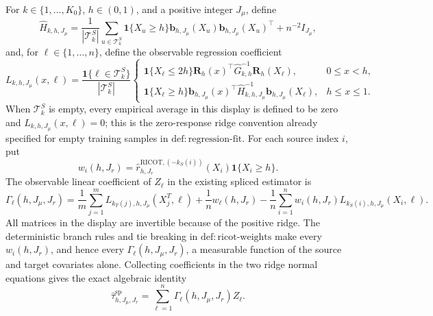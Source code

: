 For \(k\in\{1,\ldots,K_0\}\), \(h\in(0,1)\), and a positive integer \(J_\mu\), define
\[
\widehat H_{k,h,J_\mu}
=\frac1{|\mathcal T_k^S|}\sum_{u\in\mathcal T_k^S}
\mathbf 1\{X_u\ge h\}\mathbf b_{h,J_\mu}(X_u)\mathbf b_{h,J_\mu}(X_u)^\top+n^{-2}I_{J_\mu},
\]
and, for \(\ell\in\{1,\ldots,n\}\), define the observable regression coefficient
\[
L_{k,h,J_\mu}(x,\ell)=\frac{\mathbf 1\{\ell\in\mathcal T_k^S\}}{|\mathcal T_k^S|}
\begin{cases}
\mathbf 1\{X_\ell\le2h\}\mathbf R_h(x)^\top\widehat G_{k,h}^{-1}\mathbf R_h(X_\ell),&0\le x<h,\\
\mathbf 1\{X_\ell\ge h\}\mathbf b_{h,J_\mu}(x)^\top\widehat H_{k,h,J_\mu}^{-1}\mathbf b_{h,J_\mu}(X_\ell),&h\le x\le1.
\end{cases}
\]
When \(\mathcal T_k^S\) is empty, every empirical average in this display is defined to be zero and \(L_{k,h,J_\mu}(x,\ell)=0\); this is the zero-response ridge convention already specified for empty training samples in \(\mathrm{def:regression\text{-}fit}\). For each source index \(i\), put
\[
w_i(h,J_r)=\widehat r^{\mathrm{RICOT},(-k_S(i))}_{h,J_r}(X_i)\mathbf 1\{X_i\ge h\}.
\]
The observable linear coefficient of \(Z_\ell\) in the existing spliced estimator is
\[
\Gamma_\ell(h,J_\mu,J_r)
=\frac1m\sum_{j=1}^mL_{k_T(j),h,J_\mu}(X_j^T,\ell)
+\frac1n w_\ell(h,J_r)
-\frac1n\sum_{i=1}^n w_i(h,J_r)L_{k_S(i),h,J_\mu}(X_i,\ell).
\]
All matrices in the display are invertible because of the positive ridge. The deterministic branch rules and tie breaking in \(\mathrm{def:ricot\text{-}weights}\) make every \(w_i(h,J_r)\), and hence every \(\Gamma_\ell(h,J_\mu,J_r)\), a measurable function of the source and target covariates alone. Collecting coefficients in the two ridge normal equations gives the exact algebraic identity
\[
\widehat\tau^{\mathrm{sp}}_{h,J_\mu,J_r}=\sum_{\ell=1}^n\Gamma_\ell(h,J_\mu,J_r)Z_\ell.
\]